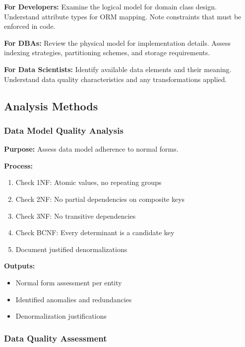 \documentclass[11pt,letterpaper]{article}
\begin{document}
\textbf{For Developers:}
Examine the logical model for domain class design. Understand attribute types for ORM mapping. Note constraints that must be enforced in code.

\textbf{For DBAs:}
Review the physical model for implementation details. Assess indexing strategies, partitioning schemes, and storage requirements.

\textbf{For Data Scientists:}
Identify available data elements and their meaning. Understand data quality characteristics and any transformations applied.

\subsection{Analysis Methods}

\subsubsection{Data Model Quality Analysis}

\begin{definitionbox}
\textbf{Purpose:} Assess data model adherence to normal forms.

\textbf{Process:}
\begin{enumerate}[nosep]
    \item Check 1NF: Atomic values, no repeating groups
    \item Check 2NF: No partial dependencies on composite keys
    \item Check 3NF: No transitive dependencies
    \item Check BCNF: Every determinant is a candidate key
    \item Document justified denormalizations
\end{enumerate}

\textbf{Outputs:}
\begin{itemize}[nosep]
    \item Normal form assessment per entity
    \item Identified anomalies and redundancies
    \item Denormalization justifications
\end{itemize}
\end{definitionbox}

\subsubsection{Data Quality Assessment}
\end{document}
